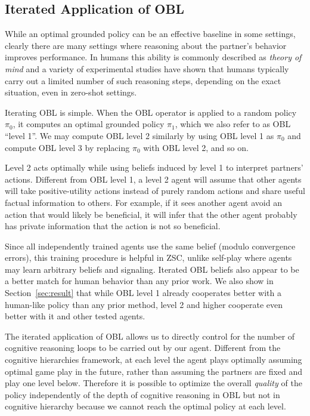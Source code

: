\subsection{Iterated Application of OBL}
\label{sec:iteratedobl}
While an optimal grounded policy can be an effective baseline in some settings, clearly there are many settings where reasoning about the partner's behavior improves performance. In humans this ability is commonly described as \emph{theory of mind} and a variety of experimental studies \cite{camerer2003,agranov2012449,kleiman2016coordinate} have shown that humans typically carry out a limited number of such reasoning steps, depending on the exact situation, even in zero-shot settings.

Iterating OBL is simple. When the OBL operator is applied to a random policy $\pi_0$, it computes an optimal grounded policy $\pi_1$, which we also refer to as OBL ``level 1''. We may compute OBL level 2 similarly by using OBL level 1 as $\pi_0$ and compute OBL level 3 by replacing $\pi_0$ with OBL level 2, and so on.

Level 2 acts optimally while using beliefs induced by level 1 to interpret partners' actions. Different from OBL level 1, a level 2 agent will assume that other agents will take positive-utility actions instead of purely random actions and share useful factual information to others. For example, if it sees another agent avoid an action that would likely be beneficial, it will infer that the other agent probably has private information that the action is not so beneficial.

Since all independently trained agents use the same belief (modulo convergence errors), this training procedure is helpful in ZSC, unlike self-play where agents may learn arbitrary beliefs and signaling. Iterated OBL beliefs also appear to be a better match for human behavior than any prior work. We also show in Section~\ref{sec:result} that while OBL level 1 already cooperates better with a human-like policy than any prior method, level 2 and higher cooperate even better with it and other tested agents.

The iterated application of OBL allows us to directly control for the number of cognitive reasoning loops to be carried out by our agent. Different from the cognitive hierarchies framework, at each level the agent plays optimally assuming optimal game play in the future, rather than assuming the partners are fixed and play one level below. Therefore it is possible to optimize the overall \emph{quality} of the policy independently of the depth of cognitive reasoning in OBL but not in cognitive hierarchy because we cannot reach the optimal policy at each level.

